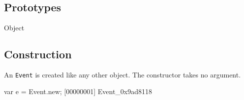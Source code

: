 \subsection{Prototypes}
\begin{refObjects}
\item[Object]
\end{refObjects}

\subsection{Construction}
\label{sec:stdlib:event:ctor}

An \lstinline{Event} is created like any other object.  The constructor
takes no argument.

\begin{urbiscript}[firstnumber=1]
var e = Event.new;
[00000001] Event_0x9ad8118
\end{urbiscript}

